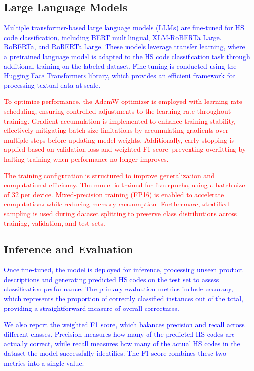 \documentclass[mnsc,nonblindrev]{informs3} %
\begin{document}
\subsection{Large Language Models}
\textcolor{blue}{Multiple transformer-based large language models (LLMs) are fine-tuned for HS code classification, including BERT multilingual, XLM-RoBERTa Large, RoBERTa, and RoBERTa Large. These models leverage transfer learning, where a pretrained language model is adapted to the HS code classification task through additional training on the labeled dataset. Fine-tuning is conducted using the Hugging Face Transformers library, which provides an efficient framework for processing textual data at scale.}

\textcolor{red}{To optimize performance, the AdamW optimizer is employed with learning rate scheduling, ensuring controlled adjustments to the learning rate throughout training. Gradient accumulation is implemented to enhance training stability, effectively mitigating batch size limitations by accumulating gradients over multiple steps before updating model weights. Additionally, early stopping is applied based on validation loss and weighted F1 score, preventing overfitting by halting training when performance no longer improves.}

\textcolor{red}{The training configuration is structured to improve generalization and computational efficiency. The model is trained for five epochs, using a batch size of 32 per device. Mixed-precision training (FP16) is enabled to accelerate computations while reducing memory consumption. Furthermore, stratified sampling is used during dataset splitting to preserve class distributions across training, validation, and test sets.}

\subsection{Inference and Evaluation}

\textcolor{blue}{Once fine-tuned, the model is deployed for inference, processing unseen product descriptions and generating predicted HS codes on the test set to assess classification performance. The primary evaluation metrics include accuracy, which represents the proportion of correctly classified instances out of the total, providing a straightforward measure of overall correctness.}

\textcolor{blue}{We also report the weighted F1 score, which balances precision and recall across different classes. Precision measures how many of the predicted HS codes are actually correct, while recall measures how many of the actual HS codes in the dataset the model successfully identifies. The F1 score combines these two metrics into a single value.}
\end{document}
